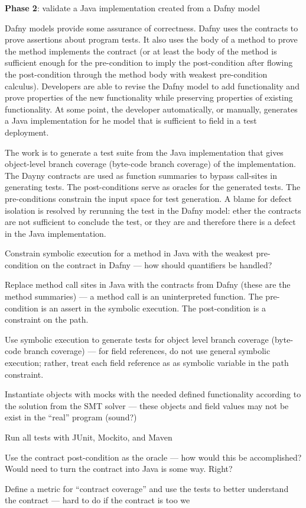 \documentclass[11pt,onecolumn,notitlepage]{article}
\begin{document}
\noindent\textbf{Phase 2}: validate a Java implementation created from a Dafny model

Dafny models provide some assurance of correctness. Dafny uses the contracts to prove assertions about program tests. It also uses the body of a method to prove the method implements the contract (or at least the body of the method is sufficient enough for the pre-condition to imply the post-condition after flowing the post-condition through the method body with weakest pre-condition calculus). Developers are able to revise the Dafny model to add functionality and prove properties of the new functionality while preserving properties of existing functionality. At some point, the developer automatically, or manually, generates a Java implementation for he model that is sufficient to field in a test deployment. 

The work is to generate a test suite from the Java implementation that gives object-level branch coverage (byte-code branch coverage) of the implementation. The Dayny contracts are used as function summaries to bypass call-sites in generating tests. The post-conditions serve as oracles for the generated tests. The pre-conditions constrain the input space for test generation. A blame for defect isolation is resolved by rerunning the test in the Dafny model: ether the contracts are not sufficient to conclude the test, or they are and therefore there is a defect in the Java implementation.

\begin{compactitem}
  \item Constrain symbolic execution for a method in Java with the weakest pre-condition on the contract in Dafny --- how should quantifiers be handled?
  \item Replace method call sites in Java with the contracts from Dafny (these are the method summaries) --- a method call is an uninterpreted function. The pre-condition is an assert in the symbolic execution. The post-condition is a constraint on the path.
  \item Use symbolic execution to generate tests for object level branch coverage (byte-code branch coverage) --- for field references, do not use general symbolic execution; rather, treat each field reference as as symbolic variable in the path constraint. 
  \item Instantiate objects with mocks with the needed defined functionality according to the solution from the SMT solver --- these objects and field values may not be exist in the “real” program (sound?)
  \item Run all tests with JUnit, Mockito, and Maven
  \item Use the contract post-condition as the oracle --- how would this be accomplished? Would need to turn the contract into Java is some way. Right?
  \item Define a metric for “contract coverage” and use the tests to better understand the contract --- hard to do if the contract is too we
\end{compactitem}
\end{document}
